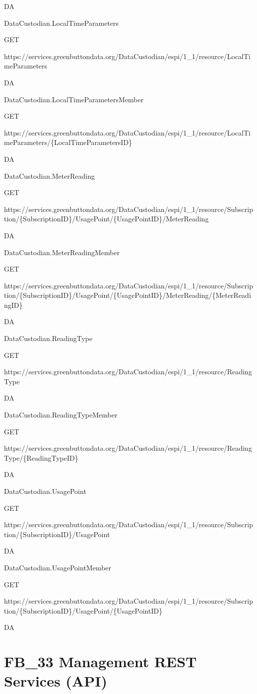 \documentclass[a4paper,12pt,single,pdftex]{scrbook}
\begin{document}
DA

DataCustodian.LocalTimeParameters

GET

https://services.greenbuttondata.org/DataCustodian/espi/1\_1/resource/LocalTimeParameters

DA

DataCustodian.LocalTimeParametersMember

GET

https://services.greenbuttondata.org/DataCustodian/espi/1\_1/resource/LocalTimeParameters/\{LocalTimeParametersID\}

DA

DataCustodian.MeterReading

GET

https://services.greenbuttondata.org/DataCustodian/espi/1\_1/resource/Subscription/\{SubscriptionID\}/UsagePoint/\{UsagePointID\}/MeterReading

DA

DataCustodian.MeterReadingMember

GET

https://services.greenbuttondata.org/DataCustodian/espi/1\_1/resource/Subscription/\{SubscriptionID\}/UsagePoint/\{UsagePointID\}/MeterReading/\{MeterReadingID\}

DA

DataCustodian.ReadingType

GET

https://services.greenbuttondata.org/DataCustodian/espi/1\_1/resource/ReadingType

DA

DataCustodian.ReadingTypeMember

GET

https://services.greenbuttondata.org/DataCustodian/espi/1\_1/resource/ReadingType/\{ReadingTypeID\}

DA

DataCustodian.UsagePoint

GET

https://services.greenbuttondata.org/DataCustodian/espi/1\_1/resource/Subscription/\{SubscriptionID\}/UsagePoint

DA

DataCustodian.UsagePointMember

GET

https://services.greenbuttondata.org/DataCustodian/espi/1\_1/resource/Subscription/\{SubscriptionID\}/UsagePoint/\{UsagePointID\}

DA\chapter{FB\_33 Management REST Services (API)}
\end{document}
